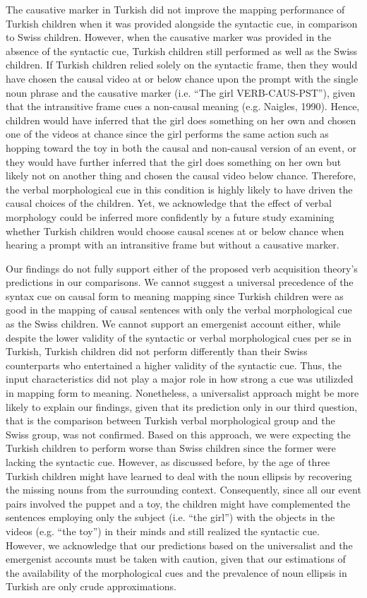 \documentclass[man]{apa6}
\begin{document}
The causative marker in Turkish did not improve the mapping performance
of Turkish children when it was provided alongside the syntactic cue, in
comparison to Swiss children. However, when the causative marker was
provided in the absence of the syntactic cue, Turkish children still
performed as well as the Swiss children. If Turkish children relied
solely on the syntactic frame, then they would have chosen the causal
video at or below chance upon the prompt with the single noun phrase and
the causative marker (i.e. \enquote{The girl VERB-CAUS-PST}), given that
the intransitive frame cues a non-causal meaning (e.g. Naigles,
1990). Hence, children would have inferred that the girl does something
on her own and chosen one of the videos at chance since the girl
performs the same action such as hopping toward the toy in both the
causal and non-causal version of an event, or they would have further
inferred that the girl does something on her own but likely not on
another thing and chosen the causal video below chance. Therefore, the
verbal morphological cue in this condition is highly likely to have
driven the causal choices of the children. Yet, we acknowledge that the
effect of verbal morphology could be inferred more confidently by a
future study examining whether Turkish children would choose causal
scenes at or below chance when hearing a prompt with an intransitive
frame but without a causative marker.

Our findings do not fully support either of the proposed verb
acquisition theory's predictions in our comparisons. We cannot suggest a
universal precedence of the syntax cue on causal form to meaning mapping
since Turkish children were as good in the mapping of causal sentences
with only the verbal morphological cue as the Swiss children. We cannot
support an emergenist account either, while despite the lower validity
of the syntactic or verbal morphological cues per se in Turkish, Turkish
children did not perform differently than their Swiss counterparts who
entertained a higher validity of the syntactic cue. Thus, the input
characteristics did not play a major role in how strong a cue was
utilizded in mapping form to meaning. Nonetheless, a universalist
approach might be more likely to explain our findings, given that its
prediction only in our third question, that is the comparison between
Turkish verbal morphological group and the Swiss group, was not
confirmed. Based on this approach, we were expecting the Turkish
children to perform worse than Swiss children since the former were
lacking the syntactic cue. However, as discussed before, by the age of
three Turkish children might have learned to deal with the noun ellipsis
by recovering the missing nouns from the surrounding context.
Consequently, since all our event pairs involved the puppet and a toy,
the children might have complemented the sentences employing only the
subject (i.e. \enquote{the girl}) with the objects in the videos (e.g.
\enquote{the toy}) in their minds and still realized the syntactic cue.
However, we acknowledge that our predictions based on the universalist
and the emergenist accounts must be taken with caution, given that our
estimations of the availability of the morphological cues and the
prevalence of noun ellipsis in Turkish are only crude approximations.
\end{document}
